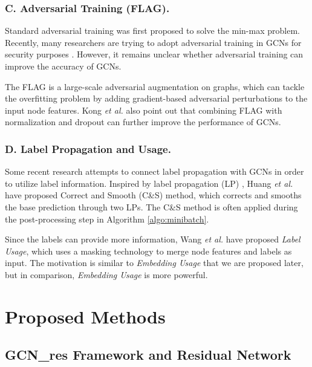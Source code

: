 \documentclass[runningheads]{llncs}
\begin{document}
\subsubsection{C. Adversarial Training
(FLAG).}
Standard adversarial training was first proposed to solve the min-max problem. Recently, many researchers are trying to
adopt adversarial training in GCNs for security purposes \cite{bojchevski2019adversarial,zhang2020gnnguard}. However, it remains unclear whether adversarial training can improve the accuracy of GCNs.

The FLAG \cite{kong2020flag} is a large-scale adversarial augmentation on graphs, which can tackle the overfitting problem by  adding gradient-based adversarial
perturbations to the input node features. Kong \textsl{et al.} \cite{kong2020flag} also point out that combining FLAG with normalization and
dropout can further improve the
performance of GCNs. 

\subsubsection{D. Label Propagation and
Usage.}
Some recent research attempts to connect label propagation with GCNs in order to utilize label information. Inspired by label propagation (LP) \cite{zhu2005semi}, 
Huang \textsl{et al.} \cite{huang2020combining} have proposed Correct and Smooth (C\&S) method, which corrects and smooths the base prediction through two
LPs. The C\&S method is often applied during the post-processing step in Algorithm \ref{algo:minibatch}.

Since the labels can
provide more information, Wang \textsl{et al.} \cite{wang2021bag} have proposed \textsl{Label Usage}, which uses a masking
technology to merge node features and labels as input. The motivation is similar to \textsl{Embedding Usage} that we are proposed
later, but in comparison, \textsl{Embedding Usage} is more
powerful.





\section{Proposed Methods}\label{methods}


\subsection{GCN\_res Framework and Residual
Network}
\end{document}

